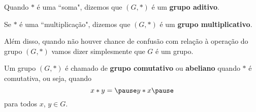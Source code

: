 \documentclass{beamer}
\begin{document}
    \begin{frame}
        \begin{observacao}
            Quando $*$ é uma ``soma", \pause dizemos que $(G,*)$ é um \textbf{grupo aditivo}.\pause

            \vspace{.3cm}

            Se $*$ é uma ``multiplicação", \pause dizemos que $(G,*)$ é um \textbf{grupo multiplicativo}.\pause

            \vspace{.3cm}
            Além disso, quando não houver chance de confusão com relação à operação do grupo $(G, *)$ \pause vamos dizer simplesmente que $G$ é um grupo.\pause
        \end{observacao}
        \end{frame}

        \begin{frame}
        \begin{definicao}
            Um grupo $(G,*)$ \pause é chamado de \textbf{grupo comutativo} \pause ou \textbf{abeliano} \pause quando $*$ é comutativa, \pause ou seja, quando \pause
            \[
                x*y = \pause y*x \pause
            \]
            para todos $x$, $y \in G$.
        \end{definicao}
    \end{frame}
\end{document}
